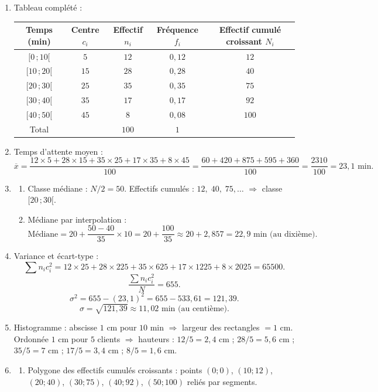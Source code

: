 \documentclass[11pt]{article}
\begin{document}
\begin{corrige}
\begin{enumerate}
\item Tableau complété :
\begin{center}
\begin{tabular}{|c|c|c|c|c|}
\hline
\rowcolor{popblueL} Temps (min) & Centre $c_i$ & Effectif $n_i$ & Fréquence $f_i$ & Effectif cumulé croissant $N_i$ \\
\hline
$[0\,;10[$ & $5$ & $12$ & $0,12$ & $12$ \\
$[10\,;20[$ & $15$ & $28$ & $0,28$ & $40$ \\
$[20\,;30[$ & $25$ & $35$ & $0,35$ & $75$ \\
$[30\,;40[$ & $35$ & $17$ & $0,17$ & $92$ \\
$[40\,;50[$ & $45$ & $8$ & $0,08$ & $100$ \\
\hline
Total & & $100$ & $1$ & \\
\hline
\end{tabular}
\end{center}
\item Temps d'attente moyen :
\[
\overline{x} = \frac{12\times5 + 28\times15 + 35\times25 + 17\times35 + 8\times45}{100}
= \frac{60+420+875+595+360}{100} = \frac{2310}{100} = 23,1 \text{ min}.
\]
\item \begin{enumerate}
\item Classe médiane : $N/2=50$. Effectifs cumulés : $12,\;40,\;75,\dots$ $\Rightarrow$ classe $[20\,;30[$.
\item Médiane par interpolation :
\[
\text{Médiane} = 20 + \frac{50-40}{35}\times 10 = 20 + \frac{100}{35} \approx 20 + 2,857 = 22,9 \text{ min (au dixième)}.
\]
\end{enumerate}
\item Variance et écart-type :
\[
\sum n_i c_i^2 = 12\times25 + 28\times225 + 35\times625 + 17\times1225 + 8\times2025 = 65500.
\]
\[
\frac{\sum n_i c_i^2}{N} = 655.
\]
\[
\sigma^2 = 655 - (23,1)^2 = 655 - 533,61 = 121,39.
\]
\[
\sigma = \sqrt{121,39} \approx 11,02 \text{ min (au centième)}.
\]
\item Histogramme : abscisse $1$ cm pour $10$ min $\Rightarrow$ largeur des rectangles $=1$ cm. Ordonnée $1$ cm pour $5$ clients $\Rightarrow$ hauteurs : $12/5=2,4$ cm ; $28/5=5,6$ cm ; $35/5=7$ cm ; $17/5=3,4$ cm ; $8/5=1,6$ cm.
\item \begin{enumerate}
\item Polygone des effectifs cumulés croissants : points $(0;0)$, $(10;12)$, $(20;40)$, $(30;75)$, $(40;92)$, $(50;100)$ reliés par segments.

\end{enumerate}
\end{enumerate}
\end{corrige}
\end{document}
